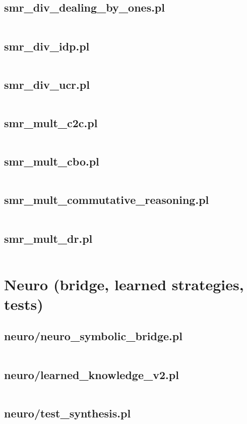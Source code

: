 \documentclass{article}
\begin{document}
\subsection{smr\_div\_dealing\_by\_ones.pl}
\inputminted{prolog}{smr_div_dealing_by_ones.pl}
\subsection{smr\_div\_idp.pl}
\inputminted{prolog}{smr_div_idp.pl}
\subsection{smr\_div\_ucr.pl}
\inputminted{prolog}{smr_div_ucr.pl}
\subsection{smr\_mult\_c2c.pl}
\inputminted{prolog}{smr_mult_c2c.pl}
\subsection{smr\_mult\_cbo.pl}
\inputminted{prolog}{smr_mult_cbo.pl}
\subsection{smr\_mult\_commutative\_reasoning.pl}
\inputminted{prolog}{smr_mult_commutative_reasoning.pl}
\subsection{smr\_mult\_dr.pl}
\inputminted{prolog}{smr_mult_dr.pl}

\section{Neuro (bridge, learned strategies, tests)}
\subsection{neuro/neuro\_symbolic\_bridge.pl}
\inputminted{prolog}{neuro/neuro_symbolic_bridge.pl}
\subsection{neuro/learned\_knowledge\_v2.pl}
\inputminted{prolog}{neuro/learned_knowledge_v2.pl}
\subsection{neuro/test\_synthesis.pl}
\inputminted{prolog}{neuro/test_synthesis.pl}
\end{document}
